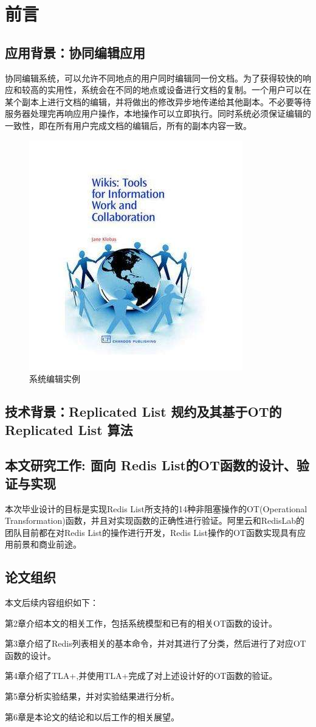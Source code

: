 \chapter{前言}
\section{应用背景：协同编辑应用}
	\par 协同编辑系统，可以允许不同地点的用户同时编辑同一份文档。为了获得较快的响应和较高的实用性，系统会在不同的地点或设备进行文档的复制。一个用户可以在某个副本上进行文档的编辑，并将做出的修改异步地传递给其他副本。不必要等待服务器处理完再响应用户操作，本地操作可以立即执行。同时系统必须保证编辑的一致性，即在所有用户完成文档的编辑后，所有的副本内容一致。
\begin{figure}
\centering
\includegraphics{figures/timg.jpg}
\caption{系统编辑实例}
\label{fig:graph}
\end{figure}
\section{技术背景：Replicated List 规约及其基于OT的 Replicated List 算法}

\section{本文研究工作: 面向 Redis List的OT函数的设计、验证与实现}
	\par 本次毕业设计的目标是实现Redis List所支持的14种非阻塞操作的OT(Operational Transformation)函数，并且对实现函数的正确性进行验证。阿里云和RedisLab的团队目前都在对Redis List的操作进行开发，Redis List操作的OT函数实现具有应用前景和商业前途。
\section{论文组织}
	\par 本文后续内容组织如下：
	\par 第2章介绍本文的相关工作，包括系统模型和已有的相关OT函数的设计。
	\par 第3章介绍了Redis列表相关的基本命令，并对其进行了分类，然后进行了对应OT函数的设计。
	\par 第4章介绍了TLA+,并使用TLA+完成了对上述设计好的OT函数的验证。
	\par 第5章分析实验结果，并对实验结果进行分析。
	\par 第6章是本论文的结论和以后工作的相关展望。